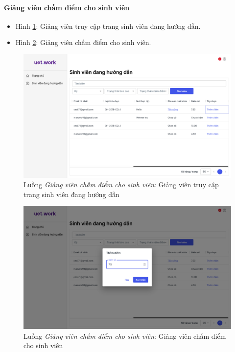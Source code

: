 \documentclass[./../main.tex]{subfiles}
\begin{document}
\paragraph*{Giảng viên chấm điểm cho sinh viên}

\begin{itemize}
	\item Hình \ref{fig:lecturer_access_students_page}: Giảng viên truy cập trang sinh viên đang hướng dẫn. 
	\item Hình \ref{fig:lecturer_score}: Giảng viên chấm điểm cho sinh viên.
\end{itemize}

\begin{figure}[]
	\includegraphics[width=\linewidth]{./images/image64.png}
	\caption{Luồng \emph{Giảng viên chấm điểm cho sinh viên}: Giảng viên truy cập trang sinh viên đang hướng dẫn}
	\label{fig:lecturer_access_students_page}
\end{figure}

\begin{figure}[]
	\includegraphics[width=\linewidth]{./images/image65.png}
	\caption{Luồng \emph{Giảng viên chấm điểm cho sinh viên}: Giảng viên chấm điểm cho sinh viên}
	\label{fig:lecturer_score}
\end{figure}
\end{document}
